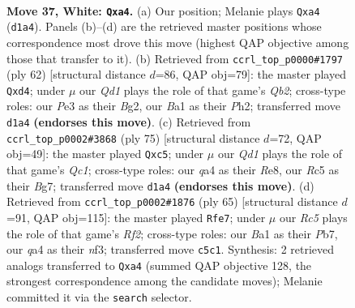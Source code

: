 \documentclass[11pt]{article}
\begin{document}
\clearpage

\begin{figure}[p]\centering
\begin{subfigure}{0.46\textwidth}\centering
\resizebox{\linewidth}{!}{%
\newchessgame
\chessboard[
  setfen={1rb2k2/7p/r2n4/1pR3p1/q7/4P1P1/P4PKP/B2QR3 w - - 0 37},
  showmover=false,
  pgfstyle=straightmove, color=movearrow, markmove={d1-a4}
]}
\caption{}
\end{subfigure}\hfill
\begin{subfigure}{0.46\textwidth}\centering
\resizebox{\linewidth}{!}{%
\newchessgame
\chessboard[
  setfen={3r2k1/1p2bp1p/p3p3/P7/3q4/6P1/1Q2PPBP/R5K1 w - - 0 32},
  showmover=false,
  pgfstyle=straightmove, color=movearrow, markmove={b2-d4}
]}
\caption{}
\end{subfigure}
\\[4pt]
\begin{subfigure}{0.46\textwidth}\centering
\resizebox{\linewidth}{!}{%
\newchessgame
\chessboard[
  setfen={2q1r1k1/5pbp/p5p1/1pQ5/4P2P/P3BP2/1P1R2K1/8 b - - 7 38},
  showmover=false,
  pgfstyle=straightmove, color=movearrow, markmove={c8-c5}
]}
\caption{}
\end{subfigure}\hfill
\begin{subfigure}{0.46\textwidth}\centering
\resizebox{\linewidth}{!}{%
\newchessgame
\chessboard[
  setfen={6k1/1p3r1p/2p3p1/3p4/4r1P1/1Q2qN1P/PR2P1B1/7K b - - 3 33},
  showmover=false,
  pgfstyle=straightmove, color=movearrow, markmove={f7-e7}
]}
\caption{}
\end{subfigure}
\caption{\textbf{Move 37, White: \texttt{Qxa4}.} (a) Our position; Melanie plays \texttt{Qxa4} (\texttt{d1a4}). Panels (b)--(d) are the retrieved master positions whose correspondence most drove this move (highest QAP objective among those that transfer to it). (b) Retrieved from \texttt{ccrl\_top\_p0000\#1797} (ply 62) [structural distance $d$=86, QAP obj=79]: the master played \texttt{Qxd4}; under $\mu$ our \emph{Qd1} plays the role of that game's \emph{Qb2}; cross-type roles: our \emph{P}e3 as their \emph{B}g2, our \emph{B}a1 as their \emph{P}h2; transferred move \texttt{d1a4} \textbf{(endorses this move)}. (c) Retrieved from \texttt{ccrl\_top\_p0002\#3868} (ply 75) [structural distance $d$=72, QAP obj=49]: the master played \texttt{Qxc5}; under $\mu$ our \emph{Qd1} plays the role of that game's \emph{Qc1}; cross-type roles: our \emph{q}a4 as their \emph{R}e8, our \emph{R}c5 as their \emph{B}g7; transferred move \texttt{d1a4} \textbf{(endorses this move)}. (d) Retrieved from \texttt{ccrl\_top\_p0002\#1876} (ply 65) [structural distance $d$=91, QAP obj=115]: the master played \texttt{Rfe7}; under $\mu$ our \emph{Rc5} plays the role of that game's \emph{Rf2}; cross-type roles: our \emph{B}a1 as their \emph{P}b7, our \emph{q}a4 as their \emph{n}f3; transferred move \texttt{c5c1}. Synthesis: 2 retrieved analogs transferred to \texttt{Qxa4} (summed QAP objective 128, the strongest correspondence among the candidate moves); Melanie committed it via the \texttt{search} selector.}
\label{fig:thought-m72}
\end{figure}
\end{document}
